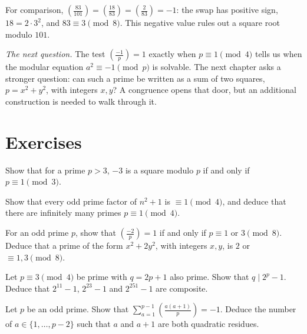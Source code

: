 For comparison,
$\left(\frac{83}{101}\right)=\left(\frac{18}{83}\right)
=\left(\frac2{83}\right)=-1$:
the swap has positive sign, $18=2\cdot3^2$, and $83\equiv3\pmod8$.
This negative value rules out a square root modulo $101$.


\medskip
\noindent\emph{The next question.} The test $\left(\frac{-1}{p}\right)=1$ exactly when $p\equiv1\pmod4$ tells us when the modular equation $a^2\equiv-1\pmod p$ is solvable. The next chapter asks a stronger question: can such a prime be written as a sum of two squares, $p=x^2+y^2$, with integers $x,y$? A congruence opens that door, but an additional construction is needed to walk through it.

\section{Exercises}

\begin{exercise}[$\star$]\label{ex:minus3}
Show that for a prime $p>3$, $-3$ is a square modulo $p$ if and only if $p\equiv1\pmod3$.
\end{exercise}

\begin{exercise}[$\star$]\label{ex:onemod4}
Show that every odd prime factor of $n^2+1$ is $\equiv1\pmod4$, and deduce that there are infinitely many primes $p\equiv1\pmod4$.
\end{exercise}

\begin{exercise}[$\star\star$]\label{ex:minus2}
For an odd prime $p$, show that $\left(\frac{-2}p\right)=1$ if and only if $p\equiv1$ or $3\pmod8$. Deduce that a prime of the form $x^2+2y^2$, with integers $x,y$, is $2$ or $\equiv1,3\pmod8$.
\end{exercise}

\begin{exercise}[$\star\star$]\label{ex:mersfactor}
Let $p\equiv3\pmod4$ be prime with $q=2p+1$ also prime. Show that $q\mid2^p-1$. Deduce that $2^{11}-1$, $2^{23}-1$ and $2^{251}-1$ are composite.
\end{exercise}

\begin{exercise}[$\star\star$]\label{ex:consecutive}
Let $p$ be an odd prime. Show that $\displaystyle\sum_{a=1}^{p-1}\left(\frac{a(a+1)}p\right)=-1$. Deduce the number of $a\in\{1,\dots,p-2\}$ such that $a$ and $a+1$ are both quadratic residues.
\end{exercise}

